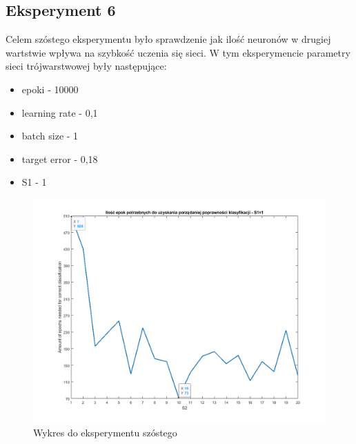 \documentclass[12pt,twoside]{article}
\begin{document}
\subsection{Eksperyment 6}
Celem szóstego eksperymentu było sprawdzenie jak ilość neuronów w drugiej wartstwie wpływa na szybkość uczenia się sieci.
W tym eksperymencie parametry sieci trójwarstwowej były następujące:
\begin{itemize}
	\item epoki - 10000
	\item learning rate - 0,1
	\item batch size - 1
	\item target error - 0,18
	\item S1 - 1
\end{itemize}
\begin{figure}[ht!]
	\centering
	\includegraphics[width=15cm]{figures/S1=1_S2_epo.png}
	\caption{Wykres do eksperymentu szóstego}
\end{figure}
\newpage
\end{document}
